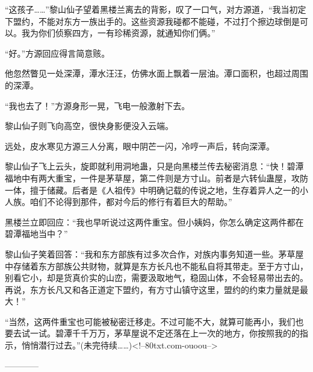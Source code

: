 \begin{this_body}
“这孩子……”黎山仙子望着黑楼兰离去的背影，叹了一口气，对方源道，“我当初定下盟约，不能对东方一族出手的。这些资源我碰都不能碰，不过打个擦边球倒是可以。我为你们侦察四方，一有珍稀资源，就通知你们俩。”

“好。”方源回应得言简意赅。

他忽然瞥见一处深潭，潭水汪汪，仿佛水面上飘着一层油。潭口面积，也超过周围的深潭。

“我也去了！”方源身形一晃，飞电一般激射下去。

黎山仙子则飞向高空，很快身影便没入云端。

远处，皮水寒见方源三人分离，眼中阴芒一闪，冷哼一声后，转向深潭。

黎山仙子飞上云头，旋即就利用洞地蛊，只是向黑楼兰传去秘密消息：“快！碧潭福地中有两大重宝，一件是茅草屋，第二件则是方寸山。前者是六转仙蛊屋，攻防一体，擅于储藏。后者是《人祖传》中明确记载的传说之地，生存着异人之一的小人族。咱们不论得到那件，都对今后的修行有着巨大的帮助。”

黑楼兰立即回应：“我也早听说过这两件重宝。但小姨妈，你怎么确定这两件都在碧潭福地当中？”

黎山仙子笑着回答：“我和东方部族有过多次合作，对族内事务知道一些。茅草屋中存储着东方部族公共财物，就算是东方长凡也不能私自将其带走。至于方寸山，别看它小，却是货真价实的山峦，需要汲取地气，稳固山体，不会轻易带出去的。再说，东方长凡又和各正道定下盟约，有方寸山镇守这里，盟约的约束力量就是最大！”

“当然，这两件重宝也可能被秘密迁移走。不过可能不大，就算可能再小，我们也要去试一试。碧潭千千万万，茅草屋说不定还落在上一次的地方，你按照我的的指示，悄悄潜行过去。”(未完待续……)<!--80txt.com-ouoou-->

------------

\end{this_body}

